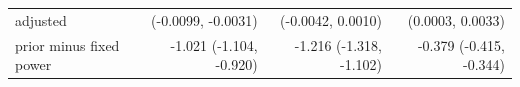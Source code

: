\begin{tabular}{lrrr}
\quad adjusted & (-0.0099, -0.0031) & (-0.0042, 0.0010) & (0.0003, 0.0033) \\
prior minus fixed power & -1.021 (-1.104, -0.920) & -1.216 (-1.318, -1.102) & -0.379 (-0.415, -0.344) \\

\end{tabular}
